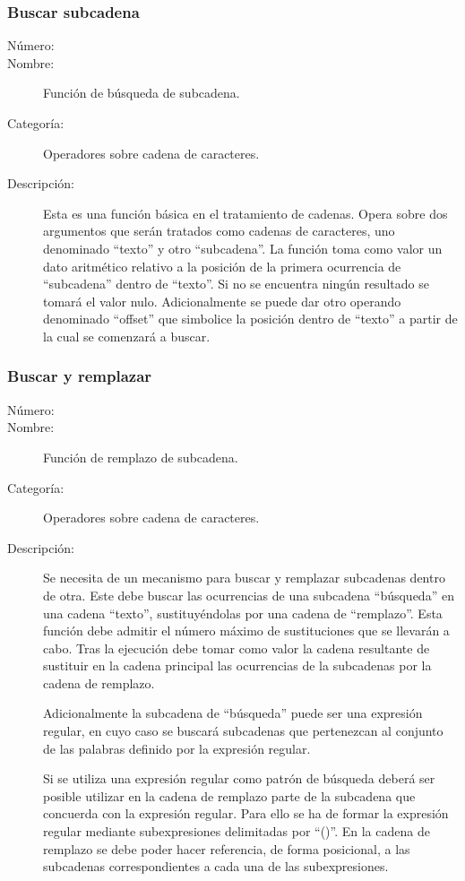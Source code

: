 \subsubsection{Buscar subcadena}
	\begin{description}
		\item [Número:] \cn
		\item [Nombre:] Función de búsqueda de subcadena.
		\item [Categoría:] Operadores sobre cadena de caracteres.
		\item [Descripción:] Esta es una función básica en el tratamiento de cadenas. Opera sobre dos argumentos
		que serán tratados como cadenas de caracteres, uno denominado ``texto'' y otro ``subcadena''. La función
		toma como valor un dato aritmético relativo a la posición de la primera ocurrencia de ``subcadena'' dentro
		de ``texto''. Si no se encuentra ningún resultado se tomará el valor nulo. Adicionalmente se puede dar otro
		operando denominado ``offset'' que simbolice la posición dentro de ``texto'' a partir de la cual se comenzará a buscar.
	\end {description}

\subsubsection{Buscar y remplazar}
	\begin{description}
		\item [Número:] \cn
		\item [Nombre:] Función de remplazo de subcadena.
		\item [Categoría:] Operadores sobre cadena de caracteres.
		\item [Descripción:] Se necesita de un mecanismo para buscar y remplazar subcadenas dentro de otra.
		Este debe buscar las ocurrencias de una subcadena ``búsqueda'' en una
		cadena ``texto'', sustituyéndolas por una cadena de ``remplazo''. Esta función debe admitir
		el número máximo de sustituciones que se llevarán a cabo. Tras la ejecución debe tomar como valor la cadena
		resultante de sustituir en la cadena principal las ocurrencias de la subcadenas por la cadena de remplazo.

		Adicionalmente la subcadena de ``búsqueda'' puede ser una expresión regular, en cuyo caso
		se buscará subcadenas que pertenezcan al conjunto de las palabras definido por la
		expresión regular.
		
		Si se utiliza una expresión regular como patrón de búsqueda deberá ser posible
		utilizar en la cadena de remplazo parte de la subcadena
		que concuerda con la expresión regular. Para ello se ha de formar la expresión regular mediante
		subexpresiones delimitadas por ``()''. En la cadena de remplazo se debe poder hacer referencia,
		de forma posicional, a las subcadenas correspondientes a cada una de las subexpresiones.
	\end {description}

